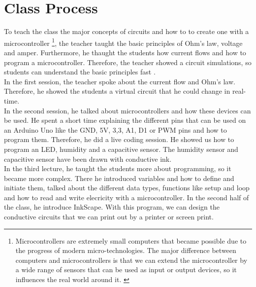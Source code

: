 \documentclass[00_doc.tex]{subfiles}
\begin{document}
    \section{Class Process}
    \begin{flushleft}
        To teach the class the major concepts of circuits and how to to create one with a 
        microcontroller {\footnote{\label{foot: microcontroller} Microcontrollers are extremely 
        small computers that became possible due to the progress of modern micro-technologies. 
        The major difference between computers and microcontrollers is that we can extend the 
        microcontroller by a wide range of sensors that can be used as input or output devices, 
        so it influences the real world around it. \cite{Schief1997, Dembowski2014}}}, the teacher 
        taught the basic principles of Ohm's law, voltage and amper. Furthermore, he thaught the 
        students how current flows and how to program a microcontroller. Therefore, the teacher 
        showed a circuit simulations, so students can understand the basic principles fast 
        \cite{Wegener2020}. \\

        In the first session, the teacher spoke about the current flow and Ohm's law. Therefore, he 
        showed the students a virtual circuit that he could change in real-time.\\

        In the second session, he talked about microcontrollers and how these devices can be used. 
        He spent a short time explaining the different pins that can be used on an Arduino Uno 
        like the GND, 5V, 3,3, A1, D1 or PWM pins and how to program them. Therefore, he did a 
        live coding session.  He showed us how to program an LED, humidity and a capacitive sensor. 
        The humidity sensor and capacitive sensor have been drawn with conductive ink.\\

        In the third lecture, he taught the students more about programming, so it became more 
        complex. There he introduced variables and how to define and initiate them, talked about
        the different data types, functions like setup and loop and how to read and write elecricity
        with a microcontroller. In the second half of the class, he introduce InkScape. With this 
        program, we can design the conductive circuits that we can print out by a printer or 
        screen print.\\


\end{flushleft}
\end{document}
